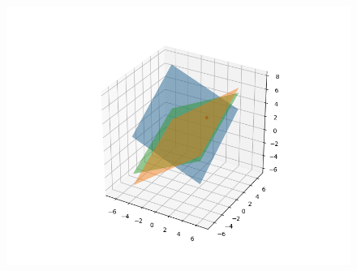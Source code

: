 \documentclass{beamer}
\theoremstyle{remark}
\numberwithin{equation}{section}
\begin{document}
\begin{frame}
\begin{figure}[H]
\centering
\includegraphics[width=0.6\columnwidth]{figs/img.png}
\caption*{}
\end{figure}
\end{frame}
\end{document}
